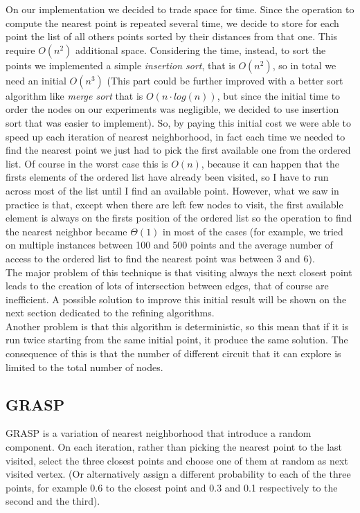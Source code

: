 \noindent On our implementation we decided to trade space for time. Since the operation to compute the nearest point is repeated several time, we decide to store for each point the list of all others points sorted by their distances from that one. This require $O(n^2)$ additional space. Considering the time, instead, to sort the points we implemented a simple \textit{insertion sort}, that is $O(n^2)$, so in total we need an initial $O(n^3)$ (This part could be further improved with a better sort algorithm like \textit{merge sort} that is $O(n \cdot log(n))$, but since the initial time to order the nodes on our experiments was negligible, we decided to use insertion sort that was easier to implement). So, by paying this initial cost we were able to speed up each iteration of nearest neighborhood, in fact each time we needed to find the nearest point we just had to pick the first available one from the ordered list. Of course in the worst case this is $O(n)$, because it can happen that the firsts elements of the ordered list have already been visited, so I have to run across most of the list until I find an available point. However, what we saw in practice is that, except when there are left few nodes to visit, the first available element is always on the firsts position of the ordered list so the operation to find the nearest neighbor became $\Theta(1)$ in most of the cases (for example, we tried on multiple instances between 100 and 500 points and the average number of access to the ordered list to find the nearest point was between 3 and 6). \\

\noindent The major problem of this technique is that visiting always the next closest point leads to the creation of lots of intersection between edges, that of course are inefficient. A possible solution to improve this initial result will be shown on the next section dedicated to the refining algorithms. \\
Another problem is that this algorithm is deterministic, so this mean that if it is run twice starting from the same initial point, it produce the same solution. The consequence of this is that the number of different circuit that it can explore is limited to the total number of nodes.

\subsection{GRASP}
GRASP is a variation of nearest neighborhood that introduce a random component. On each iteration, rather than picking the nearest point to the last visited, select the three closest points and choose one of them at random as next visited vertex. 
(Or alternatively assign a different probability to each of the three points, for example 0.6 to the closest point and 0.3 and 0.1 respectively to the second and the third).

